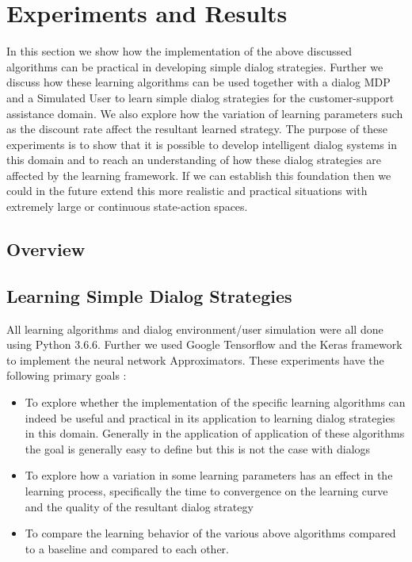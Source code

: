\documentclass[14pt]{extarticle}
\numberwithin{equation}{section}
\begin{document}
	
	\pagebreak
	\section{Experiments and Results}
	In this section we show how the implementation of the above discussed algorithms can be practical in developing simple dialog strategies. Further we discuss how these learning algorithms can be used together with a dialog MDP and a Simulated User to learn simple dialog strategies for the customer-support assistance domain. We also explore how the variation of  learning parameters such as the discount rate affect the resultant learned strategy. The purpose of these experiments is to show that it is possible to develop intelligent dialog systems in this domain and to reach an understanding of how these dialog strategies are affected by the learning framework. If we can establish this foundation then we could in the future extend this more realistic and practical situations with extremely large or continuous state-action spaces.
	\subsection{Overview}
	\subsection{Learning Simple Dialog Strategies}
	All learning algorithms and dialog environment/user simulation were all done using Python 3.6.6\cite{python}. Further we used Google Tensorflow\cite{tensorflow} and the Keras framework\cite{keras} to implement the neural network Approximators. These experiments have the following primary goals :
	\begin{itemize}
		\item To explore whether the implementation of the specific learning algorithms can indeed be useful and practical in its application to learning dialog strategies in this domain. Generally in the application of application of these algorithms the goal is generally easy to define but this is not the case with dialogs
		\item To explore how a variation in some learning parameters has an effect in the learning process, specifically the time to convergence on the learning curve and the quality of the resultant dialog strategy
		\item To compare the learning behavior of the various above algorithms compared to a baseline and compared to each other.
	\end{itemize}
\end{document}
